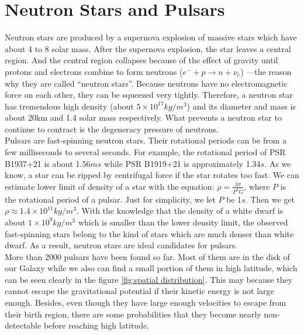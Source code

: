 \documentclass[12pt]{report}
\begin{document}
    \section{Neutron Stars and Pulsars}
        Neutron stars are produced by a supernova explosion of massive stars which have about 4 to 8 
        solar mass. After 
        the supernova explosion, the star leaves a central region. And the central region collapses because 
        of the effect of 
        gravity until protons and electrons combine to form neutrons ($e^{-}+p\rightarrow n+\nu_{e}$)
        ---the reason why they are called 
        ``neutron stars''.  
        Because neutrons have no electromagnetic force on each other, they can be squeezed very tightly. 
        Therefore, a neutron  
        star has tremendous high density (about $5\times 10^{17} kg/m^3$) and its diameter and mass is about
        20km and 
        1.4 solar mass respectively. What
        prevents a neutron star to continue to contract is the degeneracy pressure of neutrons. \\
        \indent Pulsars are fast-spinning neutron stars. Their rotational periods can be from a few 
        milliseconds
        to several seconds. For example, the rotational period of PSR B1937+21 is about 1.56$ms$ while 
        PSR B1919+21 is approximately 1.34$s$. As we know, a star can be ripped by centrifugal force if the
        star rotates too fast. We can estimate lower limit of density of a star with the equation: 
        $\rho=\frac{3\pi}{P^2G}$, where $P$ is the rotational period of a pulsar. Just for simplicity, we
        let $P$ be 1$s$. Then we get $\rho\approx 1.4\times 10^{11}kg/m^3$. With the knowledge  that the 
        density of a white dwarf is about $1\times 10^9kg/m^3$ which is smaller than the lower density limit,
        the observed fast-spinning stars belong to the kind of stars which are much denser 
        than white dwarf. As a result, neutron stars are ideal candidates for pulsars. \\
        \indent 
        More than 2000 pulsars have been found so far. Most of them are in the disk of our Galaxy while we also can 
        find a small portion of them in high latitude, which can be seen clearly in the figure \ref{fig:spatial 
        distribution}. This may 
        because they cannot escape the gravitational potential if their kinetic energy is not large enough. Besides,
        even though they have large enough velocities to escape from their birth region, there are some 
        probabilities that they become nearly non-detectable before reaching high latitude. 
        
\end{document}
